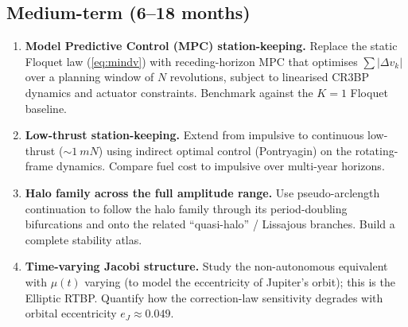 \documentclass[11pt,a4paper]{article}
\begin{document}
\subsection*{Medium-term (6--18 months)}
\begin{enumerate}[resume,leftmargin=*]
  \item \textbf{Model Predictive Control (MPC) station-keeping.}
    Replace the static Floquet law (\ref{eq:mindv}) with receding-horizon MPC that optimises $\sum |\Delta v_k|$ over a planning window of $N$ revolutions, subject to linearised CR3BP dynamics and actuator constraints. Benchmark against the $K=1$ Floquet baseline.
  \item \textbf{Low-thrust station-keeping.}
    Extend from impulsive to continuous low-thrust ($\sim\SI{1}{mN}$) using indirect optimal control (Pontryagin) on the rotating-frame dynamics. Compare fuel cost to impulsive over multi-year horizons.
  \item \textbf{Halo family across the full amplitude range.}
    Use pseudo-arclength continuation to follow the halo family through its period-doubling bifurcations and onto the related ``quasi-halo'' / Lissajous branches. Build a complete stability atlas.
  \item \textbf{Time-varying Jacobi structure.}
    Study the non-autonomous equivalent with $\mu(t)$ varying (to model the eccentricity of Jupiter's orbit); this is the Elliptic RTBP. Quantify how the correction-law sensitivity degrades with orbital eccentricity $e_J \approx 0.049$.
\end{enumerate}
\end{document}
